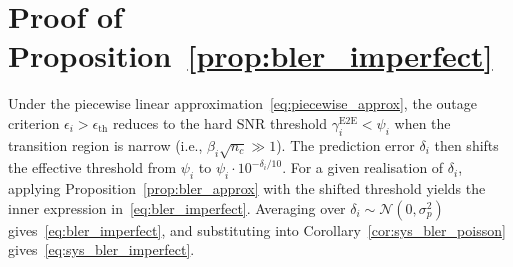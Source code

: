 \documentclass[journal]{IEEEtran}
\begin{document}
\section{Proof of Proposition~\ref{prop:bler_imperfect}}
\label{app:proof_bler_imperfect}
Under the piecewise linear approximation~\eqref{eq:piecewise_approx},
the outage criterion $\epsilon_i > \epsilon_{\mathrm{th}}$ reduces
to the hard SNR threshold $\gamma_i^{\mathrm{E2E}} < \psi_i$ when
the transition region is narrow (i.e., $\beta_i\sqrt{n_c} \gg 1$).
The prediction error $\delta_i$ then shifts the effective threshold
from $\psi_i$ to $\psi_i \cdot 10^{-\delta_i/10}$.
For a given realisation of $\delta_i$, applying
Proposition~\ref{prop:bler_approx} with the shifted threshold
yields the inner expression
in~\eqref{eq:bler_imperfect}.
Averaging over $\delta_i \sim \mathcal{N}(0,\sigma_p^2)$
gives~\eqref{eq:bler_imperfect}, and substituting into
Corollary~\ref{cor:sys_bler_poisson}
gives~\eqref{eq:sys_bler_imperfect}.




\end{document}
